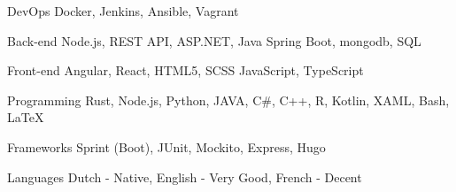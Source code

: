 

\begin{cvskills}

  \cvskill
    {DevOps} %
    {Docker, Jenkins, Ansible, Vagrant} %

  \cvskill
    {Back-end} %
    {Node.js, REST API, ASP.NET, Java Spring Boot, mongodb, SQL} %

  \cvskill
    {Front-end} %
    {Angular, React, HTML5, SCSS JavaScript, TypeScript} %

  \cvskill
    {Programming} %
    {Rust, Node.js, Python, JAVA, C\#, C++, R, Kotlin, XAML, Bash, LaTeX} %

  \cvskill
    {Frameworks} %
	{Sprint (Boot), JUnit, Mockito, Express, Hugo} %

  \cvskill
    {Languages} %
	{Dutch - Native, English - Very Good, French - Decent} %

\end{cvskills}
